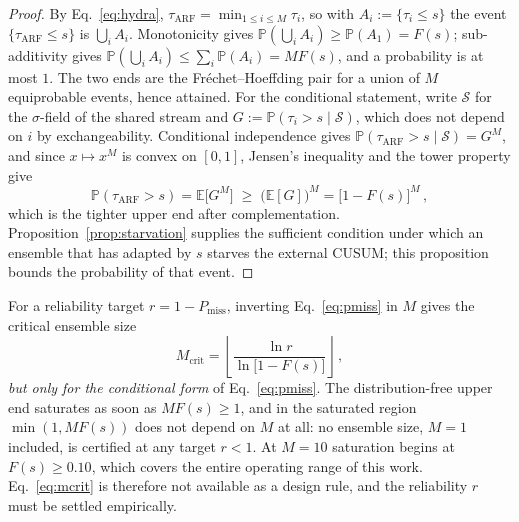 \documentclass[smallextended]{svjour3}
\begin{document}
\begin{proof}
  By Eq.~\eqref{eq:hydra}, $\tau_{\mathrm{ARF}} = \min_{1 \le i \le M} \tau_i$, so with $A_i := \{\tau_i \le s\}$ the event $\{\tau_{\mathrm{ARF}} \le s\}$ is $\bigcup_{i} A_i$.
  Monotonicity gives $\mathbb{P}(\bigcup_i A_i) \ge \mathbb{P}(A_1) = F(s)$; sub-additivity gives $\mathbb{P}(\bigcup_i A_i) \le \sum_i \mathbb{P}(A_i) = M F(s)$, and a probability is at most $1$. The two ends are the Fr\'echet--Hoeffding pair for a union of $M$ equiprobable events, hence attained.
  For the conditional statement, write $\mathcal{S}$ for the $\sigma$-field of the shared stream and $G := \mathbb{P}(\tau_i > s \mid \mathcal{S})$, which does not depend on $i$ by exchangeability. Conditional independence gives $\mathbb{P}(\tau_{\mathrm{ARF}} > s \mid \mathcal{S}) = G^M$, and since $x \mapsto x^M$ is convex on $[0,1]$, Jensen's inequality and the tower property give
  \[
    \mathbb{P}(\tau_{\mathrm{ARF}} > s) = \mathbb{E}\bigl[G^M\bigr] \;\ge\; \bigl(\mathbb{E}[G]\bigr)^M = \bigl[1 - F(s)\bigr]^M\,,
  \]
  which is the tighter upper end after complementation. Proposition~\ref{prop:starvation} supplies the sufficient condition under which an ensemble that has adapted by $s$ starves the external CUSUM; this proposition bounds the probability of that event.
\end{proof}

\begin{corollary}\label{cor:mcrit}
  For a reliability target $r = 1 - P_{\mathrm{miss}}$, inverting Eq.~\eqref{eq:pmiss} in $M$ gives the critical ensemble size
  \begin{equation}\label{eq:mcrit}
    M_{\mathrm{crit}} = \left\lfloor \frac{\ln r}{\ln\!\bigl[1 - F(s)\bigr]} \right\rfloor\,,
  \end{equation}
  \emph{but only for the conditional form} of Eq.~\eqref{eq:pmiss}. The distribution-free upper end saturates as soon as $M F(s) \ge 1$, and in the saturated region $\min(1, M F(s))$ does not depend on $M$ at all: no ensemble size, $M = 1$ included, is certified at any target $r < 1$. At $M = 10$ saturation begins at $F(s) \ge 0.10$, which covers the entire operating range of this work. Eq.~\eqref{eq:mcrit} is therefore not available as a design rule, and the reliability $r$ must be settled empirically.
\end{corollary}
\end{document}
